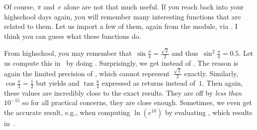 Of course, $\pi$ and~$e$ alone are not that much useful.
If you reach back into your highschool days again, you will remember many interesting functions that are related to them.
Let us import a few of them, again from the  module, via .
I think you can guess what these functions do.

From highschool, you may remember that~$\sin{\frac{\pi}{4}}=\frac{\sqrt{2}}{2}$ and thus~$\sin^2{\frac{\pi}{4}}=0.5$.
Let us compute this in \python\ by doing .
Surprisingly, we get  instead of .
The reason is again the limited precision of , which cannot represent~$\frac{\sqrt{2}}{2}$ exactly.
Similarly, $\cos{\frac{\pi}{3}}=\frac{1}{2}$ but  yields  and $\tan{\frac{\pi}{4}}$ expressed as  returns  instead of~$1$.
Then again, these values are incredibly close to the exact results.
They are off by \emph{less than~$10^{-15}$} so for all practical concerns, they are close enough.
Sometimes, we even get the accurate result, e.g., when computing $\ln(e^{10})$ by evaluating , which results in~.

